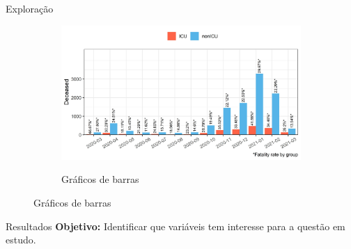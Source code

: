 \documentclass[pdf]
{beamer}
\begin{document}
\begin{frame}{Exploração}
\begin{figure}
\begin{subfigure}[][40pt][t]{0.3\textwidth}
		\caption*{Gráficos de barras}
		\vspace{-0.4cm}
   		 \includegraphics[width=\textwidth]{Imagens/histPlot_Discharge_month_Type_Death.jpeg}\\
	\end{subfigure}
\end{figure}
\end{frame}

\begin{frame}{Resultados}
\textbf{Objetivo:} Identificar que variáveis tem interesse para a questão em estudo.

\end{frame}
\end{document}
